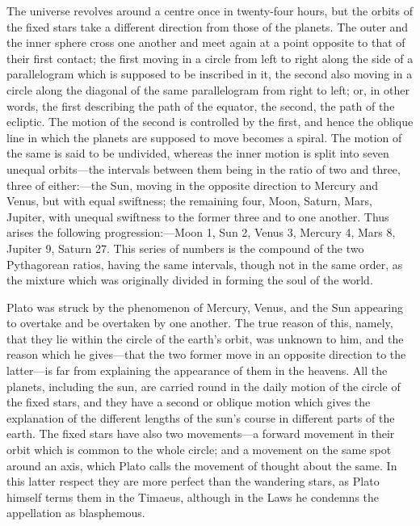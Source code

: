 \documentclass[11pt,letter]{article}
\begin{document}
\par  The universe revolves around a centre once in twenty-four hours, but the orbits of the fixed stars take a different direction from those of the planets. The outer and the inner sphere cross one another and meet again at a point opposite to that of their first contact; the first moving in a circle from left to right along the side of a parallelogram which is supposed to be inscribed in it, the second also moving in a circle along the diagonal of the same parallelogram from right to left; or, in other words, the first describing the path of the equator, the second, the path of the ecliptic. The motion of the second is controlled by the first, and hence the oblique line in which the planets are supposed to move becomes a spiral. The motion of the same is said to be undivided, whereas the inner motion is split into seven unequal orbits—the intervals between them being in the ratio of two and three, three of either:—the Sun, moving in the opposite direction to Mercury and Venus, but with equal swiftness; the remaining four, Moon, Saturn, Mars, Jupiter, with unequal swiftness to the former three and to one another. Thus arises the following progression:—Moon 1, Sun 2, Venus 3, Mercury 4, Mars 8, Jupiter 9, Saturn 27. This series of numbers is the compound of the two Pythagorean ratios, having the same intervals, though not in the same order, as the mixture which was originally divided in forming the soul of the world.

\par  Plato was struck by the phenomenon of Mercury, Venus, and the Sun appearing to overtake and be overtaken by one another. The true reason of this, namely, that they lie within the circle of the earth’s orbit, was unknown to him, and the reason which he gives—that the two former move in an opposite direction to the latter—is far from explaining the appearance of them in the heavens. All the planets, including the sun, are carried round in the daily motion of the circle of the fixed stars, and they have a second or oblique motion which gives the explanation of the different lengths of the sun’s course in different parts of the earth. The fixed stars have also two movements—a forward movement in their orbit which is common to the whole circle; and a movement on the same spot around an axis, which Plato calls the movement of thought about the same. In this latter respect they are more perfect than the wandering stars, as Plato himself terms them in the Timaeus, although in the Laws he condemns the appellation as blasphemous.
\end{document}
